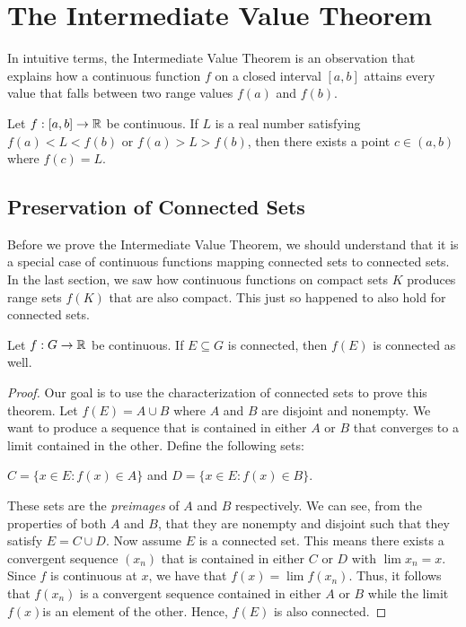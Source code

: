 \section{The Intermediate Value Theorem}

In intuitive terms, the Intermediate Value Theorem is an observation that explains how a continuous function \( f \) on a closed interval \( [a,b] \) attains every value that falls between two range values \( f(a) \) and \( f(b) \).


\begin{theorem}
    Let \( f: [a,b] \to \mathbb{R}  \) be continuous. If \( L  \) is a real number satisfying \( f(a) < L < f(b) \) or \( f(a) > L > f(b) \), then there exists a point \( c \in (a,b) \) where \( f(c) = L  \).
    \end{theorem}

\subsection{Preservation of Connected Sets}

Before we prove the Intermediate Value Theorem, we should understand that it is a special case of continuous functions mapping connected sets to connected sets. In the last section, we saw how continuous functions on compact sets \( K  \) produces range sets \( f(K) \) that are also compact. This just so happened to also hold for connected sets.


\begin{theorem}
    Let \( f: G \to \mathbb{R}  \) be continuous. If \( E \subseteq G  \) is connected, then \( f(E) \) is connected as well.
    \end{theorem}

\begin{proof}
Our goal is to use the characterization of connected sets to prove this theorem. Let \( f(E) = A \cup B  \) where \( A  \) and \( B  \) are disjoint and nonempty. We want to produce a sequence that is contained in either \( A  \) or \( B  \) that converges to a limit contained in the other. Define the following sets:
\begin{center}
    \( C = \{ x \in E: f(x) \in A  \}  \) and \( D = \{ x \in E : f(x) \in B  \}  \).
\end{center}
These sets are the \textit{preimages} of \( A  \) and \( B  \) respectively. We can see, from the properties of both \( A  \) and \( B  \), that they are nonempty and disjoint such that they satisfy \( E = C \cup D  \). Now assume \( E  \) is a connected set. This means there exists a convergent sequence \( (x_n)  \) that is contained in either \( C  \) or \( D  \) with \( \lim x_n = x  \). Since \( f \) is continuous at \( x  \), we have that \( f(x) = \lim f(x_n) \). Thus, it follows that \( f(x_n) \) is a convergent sequence contained in either \( A  \) or \( B  \) while the limit \( f(x)  \)is an element of the other. Hence, \( f(E ) \) is also connected.
\end{proof}

